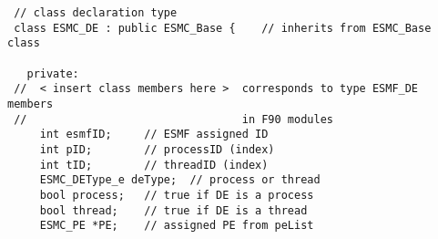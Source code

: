 
\begin{verbatim}
 // class declaration type
 class ESMC_DE : public ESMC_Base {    // inherits from ESMC_Base class

   private:
 //  < insert class members here >  corresponds to type ESMF_DE members
 //                                 in F90 modules
     int esmfID;     // ESMF assigned ID
     int pID;        // processID (index)
     int tID;        // threadID (index)
     ESMC_DEType_e deType;  // process or thread
     bool process;   // true if DE is a process
     bool thread;    // true if DE is a thread
     ESMC_PE *PE;    // assigned PE from peList
\end{verbatim}
